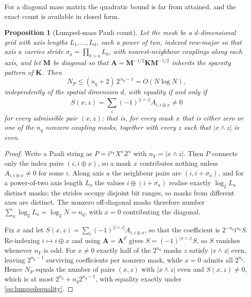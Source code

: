 \documentclass{ieeeaccess}
\newcommand{\M}{\mathbf{M}}
\newcommand{\K}{\mathbf{K}}
\newcommand{\A}{\mathbf{A}}
\newtheorem{proposition}{Proposition}
\begin{document}
For a diagonal mass matrix the quadratic bound is far from attained, and the exact count is available in closed form.

\begin{proposition}[Lumped-mass Pauli count]
\label{prop:lumped}
Let the mesh be a $d$-dimensional grid with axis lengths $L_1,\ldots,L_d$, each a power of two, indexed row-major so that axis $a$ carries stride $\sigma_a=\prod_{b>a}L_b$, with nearest-neighbour couplings along each axis, and let $\M$ be diagonal so that $\A=\M^{-1/2}\K\M^{-1/2}$ inherits the sparsity pattern of $\K$. Then
\begin{equation}
N_P\le(n_q+2)\,2^{\,n_q-1}=O(N\log N),
\label{eq:lumpedcount}
\end{equation}
independently of the spatial dimension $d$, with equality if and only if
\begin{equation}
S(x,z)=\sum_i(-1)^{|i\wedge z|}A_{i,i\oplus x}\neq0
\label{eq:lumpedequality}
\end{equation}
for every admissible pair $(x,z)$: that is, for every mask $x$ that is either zero or one of the $n_q$ nonzero coupling masks, together with every $z$ such that $|x\wedge z|$ is even.
\end{proposition}

\begin{proof}
Write a Pauli string as $P=\mathrm i^{n_Y}X^{x}Z^{z}$ with $n_Y=|x\wedge z|$. Then $P$ connects only the index pairs $(i,i\oplus x)$, so a mask $x$ contributes nothing unless $A_{i,i\oplus x}\ne0$ for some $i$. Along axis $a$ the neighbour pairs are $(i,i+\sigma_a)$, and for a power-of-two axis length $L_a$ the values $i\oplus(i+\sigma_a)$ realise exactly $\log_2 L_a$ distinct masks; the strides occupy disjoint bit ranges, so masks from different axes are distinct. The nonzero off-diagonal masks therefore number $\sum_a\log_2 L_a=\log_2 N=n_q$, with $x=0$ contributing the diagonal.

Fix $x$ and let $S(x,z)=\sum_i(-1)^{|i\wedge z|}A_{i,i\oplus x}$, so that the coefficient is $2^{-n_q}\mathrm i^{n_Y}S$. Re-indexing $i\mapsto i\oplus x$ and using $\A=\A^T$ gives $S=(-1)^{|x\wedge z|}S$, so $S$ vanishes whenever $n_Y$ is odd. For $x\ne0$ exactly half of the $2^{n_q}$ masks $z$ satisfy $|x\wedge z|$ even, leaving $2^{n_q-1}$ surviving coefficients per nonzero mask, while $x=0$ admits all $2^{n_q}$. Hence $N_P$ equals the number of pairs $(x,z)$ with $|x\wedge z|$ even and $S(x,z)\ne0$, which is at most $2^{n_q}+n_q2^{n_q-1}$, with equality exactly under \cref{eq:lumpedequality}.
\end{proof}
\end{document}
